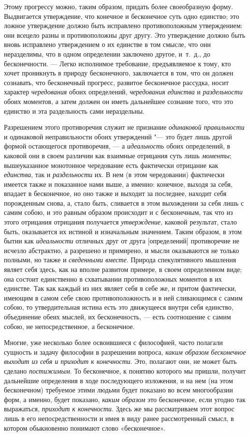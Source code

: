 Этому прогрессу можно, таким образом, придать более своеобразную форму.
Выдвигается утверждение, что конечное и бесконечное суть одно единство; это
ложное утверждение должно быть исправлено противоположным утверждением: они
всецело разны и противоположны друг другу. Это утверждение должно быть
вновь исправлено утверждением о их единстве в том смысле, что они
неразделимы, что в одном определении заключено другое, и~т.~д., до
бесконечности. — Легко исполнимое требование, предъявляемое к тому, кто
хочет проникнуть в природу бесконечного, заключается в том, что он должен
сознавать, что бесконечный прогресс, развитое бесконечное рассудка, носит
характер {\em чередования} обоих определений,
{\em чередования единства} и
{\em раздельности} обоих моментов, а затем должен он
иметь дальнейшее сознание того, что это единство и эта раздельность сами
нераздельны.

Разрешением этого противоречия служит не признание
{\em одинаковой правильности} и одинаковой
неправильности обоих утверждений "--- это будет лишь другой формой остающегося
противоречия, — а {\em идеальность} обоих определений,
в каковой они в своем различии как взаимные отрицания суть лишь
{\em моменты}; вышеуказанное монотонное чередование
есть фактически отрицание как {\em единства}, так и
{\em раздельности} их. В нем (в этом чередовании)
фактически имеется также и показанное нами выше, а именно: конечное, выходя
за себя, впадает в бесконечное, но оно также и выходит за последнее,
находит себя порожденным снова, а, стало быть, сливается в этом выхождении
за себя лишь с самим собою, и это равным образом происходит и с
бесконечным, так что из этого отрицания отрицания получается
{\em утверждение}, каковой результат, стало быть,
оказывается их истиной и изначальным значением. Таким образом, в этом бытии
как {\em идеальности} отличных друг от друга
[определений] противоречие не исчезло абстрактно, а разрешено и примирено,
и мысли оказываются не только полными, но также и
{\em сведенными вместе}. Природа спекулятивного
мышления являет себя здесь, как на вполне развитом примере, в своем
определенном виде; она состоит единственно в схватывании противоположных
моментов в их единстве. Так как каждый из них являет себя в себе же, и
притом фактически, имеющим в самом себе свою противоположность и в ней
сливающимся с самим собою, то утвердительная истина есть это движущееся
внутри себя единство, объединение обеих мыслей, их бесконечность, — есть
соотношение с самим собою, не непосредственное, а бесконечное.

Многие, уже несколько более освоившиеся с философией, часто полагали
сущность и задачу философии в разрешении вопроса,
{\em каким образом бесконечное выходит из себя и
приходит к конечности}. Это, полагают они, не может быть сделано
{\em постижимым}. То бесконечное, к понятию которого мы
пришли, получит дальнейшие определения в ходе последующего изложения, и на
нем (на этом бесконечном) требуемое этими людьми будет показано во всем
многообразии форм, а именно, будет показано, {\em каким
образом} это бесконечное, если угодно так выражаться,
{\em приходит к конечности}. Здесь же мы рассматриваем
этот вопрос лишь в его непосредственности и имея в виду ранее рассмотренный
смысл, в котором обыкновенно понимают слово «бесконечное».


